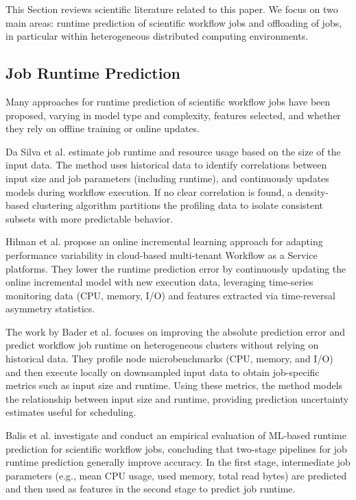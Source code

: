 This Section reviews scientific literature related to this paper.
We focus on two main areas: runtime prediction of scientific workflow jobs and offloading of jobs, in particular within heterogeneous distributed computing environments.

\subsection{Job Runtime Prediction}
Many approaches for runtime prediction of scientific workflow jobs have been proposed, varying in model type and complexity, features selected, and whether they rely on offline training or online updates.

Da Silva et al. \cite{da_silva_online_2015} estimate job runtime and resource usage based on the size of the input data. The method uses historical data to identify correlations between input size and job parameters (including runtime), and continuously updates models during workflow execution. If no clear correlation is found, a density-based clustering algorithm partitions the profiling data to isolate consistent subsets with more predictable behavior.

Hilman et al. \cite{hilman_task_2018} propose an online incremental learning approach for adapting performance variability in cloud-based multi-tenant Workflow as a Service platforms. They lower the runtime prediction error by continuously updating the online incremental model with new execution data, leveraging time-series monitoring data (CPU, memory, I/O) and features extracted via time-reversal asymmetry statistics.

The work by Bader et al. \cite{bader_lotaru_2024, bader_lotaru_2022} focuses on improving the absolute prediction error and predict workflow job runtime on heterogeneous clusters without relying on historical data. They profile node microbenchmarks (CPU, memory, and I/O) and then execute locally on downsampled input data to obtain job-specific metrics such as input size and runtime. Using these metrics, the method models the relationship between input size and runtime, providing prediction uncertainty estimates useful for scheduling.

Balis et al. \cite{balis_evaluation_2023,balis_improving_2024} investigate and conduct an empirical evaluation of ML-based runtime prediction for scientific workflow jobs, concluding that two-stage pipelines for job runtime prediction generally improve accuracy. In the first stage, intermediate job parameters (e.g., mean CPU usage, used memory, total read bytes) are predicted and then used as features in the second stage to predict job runtime. 



